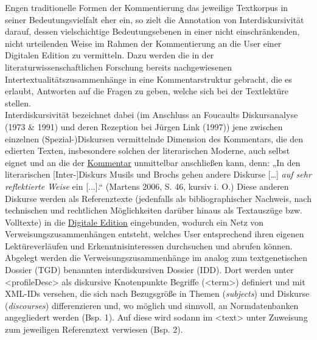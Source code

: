 \documentclass{article}
\begin{document}
    Engen traditionelle Formen der Kommentierung das jeweilige Textkorpus in seiner
                  Bedeutungsvielfalt eher ein, so zielt die Annotation von Interdiskursivität
                  darauf, dessen vielschichtige Bedeutungsebenen in einer nicht einschränkenden,
                  nicht urteilenden Weise im Rahmen der Kommentierung an die User einer Digitalen
                  Edition zu vermitteln. Dazu werden die in der literaturwissenschaftlichen
                  Forschung bereits nachgewiesenen Intertextualitätszusammenhänge in eine
                  Kommentarstruktur gebracht, die es erlaubt, Antworten auf die Fragen zu geben,
                  welche sich bei der Textlektüre stellen. \\
            
        Interdiskursivität bezeichnet dabei (im Anschluss an Foucaults Diskursanalyse
                     (1973 \& 1991) und deren Rezeption bei Jürgen Link
                     (1997)) jene zwischen einzelnen (Spezial-)Diskursen vermittelnde
                  Dimension des Kommentars, die den edierten Texten, insbesondere solchen der
                  literarischen Moderne, auch selbst eignet und an die der \href{http://gams.uni-graz.at/o:konde.34}{Kommentar} unmittelbar anschließen kann, denn: „In
                  den literarischen [Inter-]Diskurs Musils und Brochs gehen andere Diskurse […] \emph{auf sehr reflektierte Weise} ein [...].“ (Martens 2006,
                     S. 46, kursiv i. O.) Diese anderen Diskurse werden als Referenztexte
                  (jedenfalls als bibliographischer Nachweis, nach technischen und rechtlichen
                  Möglichkeiten darüber hinaus als Textauszüge bzw. Volltexte) in die \href{http://gams.uni-graz.at/o:konde.59}{Digitale Edition} eingebunden,
                  wodurch ein Netz von Verweisungszusammenhängen entsteht, welches User entsprechend
                  ihren eigenen Lektüreverläufen und Erkenntnisinteressen durchsuchen und abrufen
                  können. \\
            
        Abgelegt werden die Verweisungszusammenhänge im analog zum textgenetischen Dossier
                  (TGD) benannten interdiskursiven Dossier (IDD). Dort werden unter
                     <profileDesc> als diskursive Knotenpunkte Begriffe
                     (<term>) definiert und mit XML-IDs versehen, die sich nach
                  Bezugsgröße in Themen (\emph{subjects}) und Diskurse (\emph{discourses}) differenzieren und, wo möglich und sinnvoll, an
                  Normdatenbanken angegliedert werden (Bsp. 1). Auf diese wird sodann im
                     <text> unter Zuweisung zum jeweiligen Referenztext verwiesen
                  (Bsp. 2).\\
            
\end{document}

